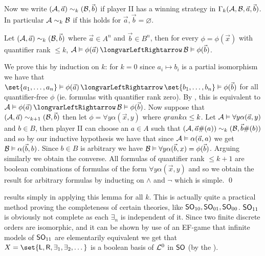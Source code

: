 \edefn

Now we write $({\cal A},\vec a)\sim_k({\cal B},\vec b)$ if player II has a winning strategy in $\Gamma_k({\cal A},{\cal B},\vec a,\vec b)$.
In particular ${\cal A}\sim_k{\cal B}$ if this holds for $\vec a,\vec b=\varnothing$.

\blemm

    Let $({\cal A},\vec a)\sim_k({\cal B},\vec b)$ where $\vec a\in A^n$ and $\vec b\in B^n$, then for every $\phi=\phi(\vec x)$ with quantifier rank $\leq k$,
    ${\cal A}\vDash\phi(\vec a)\iff{\cal B}\vDash\phi(\vec b)$.

\elemm

We prove this by induction on $k$: for $k=0$ since $a_i\mapsto b_i$ is a partial isomorphism we have that $\set{a_1,\dots,a_n}\vDash\phi(\vec a)\iff\set{b_1,\dots,b_n}\vDash\phi(\vec b)$ for all
quantifier-free $\phi$ (ie. formulas with quantifier rank zero).
By , this is equivalent to ${\cal A}\vDash\phi(\vec a)\iff{\cal B}\vDash\phi(\vec b)$.
Now suppose that $({\cal A},\vec a)\sim_{k+1}({\cal B},\vec b)$ then let $\phi=\forall y\alpha(\vec x,y)$ where ${\sl qrank}\alpha\leq k$.
Let ${\cal A}\vDash\forall y\alpha(\vec a,y)$ and $b\in B$, then player II can choose an $a\in A$ such that $({\cal A},\vec a\#(a))\sim_k({\cal B},\vec b\#(b))$ and so by our inductive hypothesis we have
that since ${\cal A}\vDash\alpha(\vec a,a)$ we get ${\cal B}\vDash\alpha(\vec b,b)$.
Since $b\in B$ is arbitrary we have ${\cal B}\vDash\forall y\alpha(\vec b,x)=\phi(\vec b)$.
Arguing similarly we obtain the converse.
All formulas of quantifier rank $\leq k+1$ are boolean combinations of formulas of the form $\forall y\alpha(\vec x,y)$ and so we obtain the result for arbitrary formulas by inducting on $\land$ and $\neg$
which is simple.
\qed

 results simply in applying this lemma for all $k$.
This is actually quite a practical method proving the completeness of certain theories, like ${\sf SO}_{10},{\sf SO}_{01},{\sf SO}_{00}$.
${\sf SO}_{11}$ is obviously not complete as each $\exists_n$ is independent of it.
Since two finite discrete orders are isomorphic, and it can be shown by use of an EF-game that infinite models of ${\sf SO}_{11}$ are elementarily equivalent we get that
$X=\set{{\sf L},{\sf R},\exists_1,\exists_2,\dots}$ is a boolean basis of ${\cal L}^0$ in ${\sf SO}$ (by the ).

